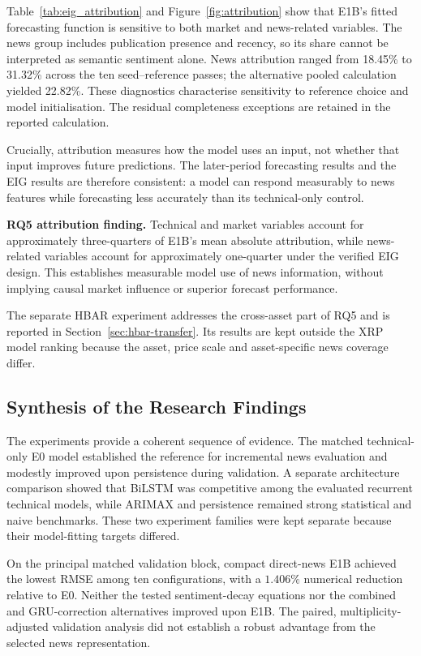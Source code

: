 Table~\ref{tab:eig_attribution} and Figure~\ref{fig:attribution} show that E1B's fitted forecasting function is sensitive to both market and news-related variables. The news group includes publication presence and recency, so its share cannot be interpreted as semantic sentiment alone. News attribution ranged from 18.45\% to 31.32\% across the ten seed--reference passes; the alternative pooled calculation yielded 22.82\%. These diagnostics characterise sensitivity to reference choice and model initialisation. The residual completeness exceptions are retained in the reported calculation.

Crucially, attribution measures how the model uses an input, not whether that input improves future predictions. The later-period forecasting results and the EIG results are therefore consistent: a model can respond measurably to news features while forecasting less accurately than its technical-only control.

\noindent\textbf{RQ5 attribution finding.} Technical and market variables account for approximately three-quarters of E1B's mean absolute attribution, while news-related variables account for approximately one-quarter under the verified EIG design. This establishes measurable model use of news information, without implying causal market influence or superior forecast performance.


The separate HBAR experiment addresses the cross-asset part of RQ5 and is reported in Section~\ref{sec:hbar-transfer}. Its results are kept outside the XRP model ranking because the asset, price scale and asset-specific news coverage differ.

\subsection{Synthesis of the Research Findings}
\label{subsec:experimental-synthesis}

The experiments provide a coherent sequence of evidence. The matched technical-only E0 model established the reference for incremental news evaluation and modestly improved upon persistence during validation. A separate architecture comparison showed that BiLSTM was competitive among the evaluated recurrent technical models, while ARIMAX and persistence remained strong statistical and naive benchmarks. These two experiment families were kept separate because their model-fitting targets differed.

On the principal matched validation block, compact direct-news E1B achieved the lowest RMSE among ten configurations, with a $1.406\%$ numerical reduction relative to E0. Neither the tested sentiment-decay equations nor the combined and GRU-correction alternatives improved upon E1B. The paired, multiplicity-adjusted validation analysis did not establish a robust advantage from the selected news representation.

